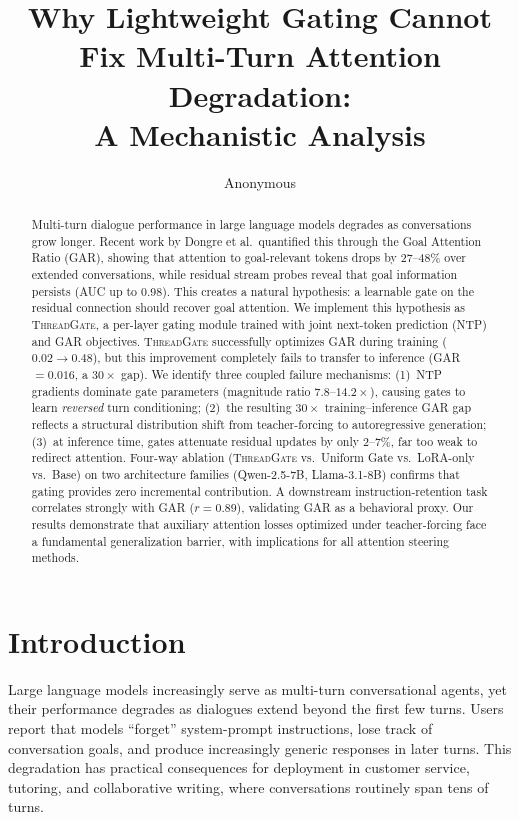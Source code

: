 \documentclass[11pt,a4paper]{article}
\title{Why Lightweight Gating Cannot Fix Multi-Turn Attention Degradation:\\A Mechanistic Analysis}
\author{Anonymous}
\date{}
\newcommand{\gar}{\textsc{GAR}}
\newcommand{\tg}{\textsc{ThreadGate}}
\begin{document}
\maketitle

\begin{abstract}
Multi-turn dialogue performance in large language models degrades as conversations grow longer.
Recent work by Dongre et al.\ quantified this through the Goal Attention Ratio (\gar{}), showing that attention to goal-relevant tokens drops by 27--48\% over extended conversations, while residual stream probes reveal that goal information persists (AUC up to 0.98).
This creates a natural hypothesis: a learnable gate on the residual connection should recover goal attention.
We implement this hypothesis as \tg{}, a per-layer gating module trained with joint next-token prediction (NTP) and \gar{} objectives.
\tg{} successfully optimizes \gar{} during training ($0.02 \to 0.48$), but this improvement completely fails to transfer to inference (\gar{}$= 0.016$, a $30\times$ gap).
We identify three coupled failure mechanisms: (1)~NTP gradients dominate gate parameters (magnitude ratio $7.8$--$14.2\times$), causing gates to learn \emph{reversed} turn conditioning; (2)~the resulting $30\times$ training--inference \gar{} gap reflects a structural distribution shift from teacher-forcing to autoregressive generation; (3)~at inference time, gates attenuate residual updates by only 2--7\%, far too weak to redirect attention.
Four-way ablation (\tg{} vs.\ Uniform Gate vs.\ LoRA-only vs.\ Base) on two architecture families (Qwen-2.5-7B, Llama-3.1-8B) confirms that gating provides zero incremental contribution.
A downstream instruction-retention task correlates strongly with \gar{} ($r = 0.89$), validating \gar{} as a behavioral proxy.
Our results demonstrate that auxiliary attention losses optimized under teacher-forcing face a fundamental generalization barrier, with implications for all attention steering methods.
\end{abstract}

\section{Introduction}
\label{sec:intro}

Large language models increasingly serve as multi-turn conversational agents, yet their performance degrades as dialogues extend beyond the first few turns.
Users report that models ``forget'' system-prompt instructions, lose track of conversation goals, and produce increasingly generic responses in later turns.
This degradation has practical consequences for deployment in customer service, tutoring, and collaborative writing, where conversations routinely span tens of turns.
\end{document}
